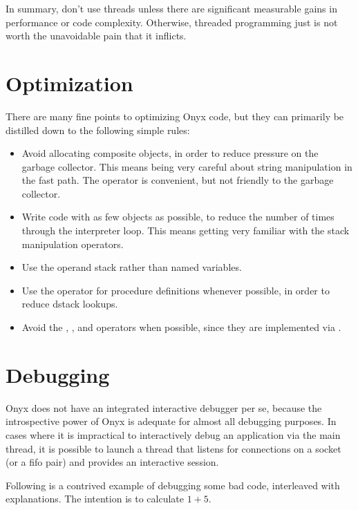 In summary, don't use threads unless there are significant measurable gains in
performance or code complexity.  Otherwise, threaded programming just is not
worth the unavoidable pain that it inflicts.

\section{Optimization}

There are many fine points to optimizing Onyx code, but they can primarily be
distilled down to the following simple rules:

\begin{itemize}
\item{Avoid allocating composite objects, in order to reduce pressure on the
  garbage collector.  This means being very careful about string manipulation in
  the fast path.  The  operator is
  convenient, but not friendly to the garbage collector.}
\item{Write code with as few objects as possible, to reduce the number of times
  through the interpreter loop.  This means getting very familiar with the stack
  manipulation operators.}
\item{Use the operand stack rather than named variables.}
\item{Use the  operator for
  procedure definitions whenever possible, in order to reduce dstack lookups.}
\item{Avoid the ,
  , and
   operators when possible, since
  they are implemented via .}
\end{itemize}

\section{Debugging}

Onyx does not have an integrated interactive debugger per se, because the
introspective power of Onyx is adequate for almost all debugging purposes.  In
cases where it is impractical to interactively debug an application via the main
thread, it is possible to launch a thread that listens for connections on a
socket (or a fifo pair) and provides an interactive session.

Following is a contrived example of debugging some bad code, interleaved with
explanations.  The intention is to calculate $1 + 5$.

